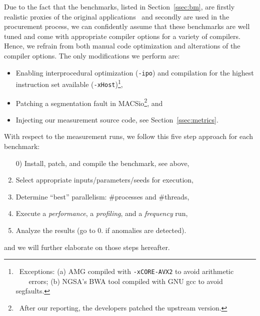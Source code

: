 Due to the fact that the benchmarks, listed in Section~\ref{ssec:bm}, are firstly realistic proxies of the
original applications~\cite{aaziz_methodology_2018} and secondly are used in the procurement process, we can confidently assume
that these benchmarks are well tuned and come with appropriate compiler options for a variety of compilers.
Hence, we refrain from both manual code optimization and alterations of the compiler options.
%
%
The only modifications we perform are:
\begin{itemize}
    \item Enabling interprocedural optimization (\texttt{-ipo}) and compilation for the highest instruction set available (\texttt{-xHost})\footnote{~Exceptions: (a) AMG compiled with \texttt{-xCORE-AVX2} to avoid arithmetic \\$~~~\,\quad$errors; (b) NGSA's BWA tool compiled with GNU gcc to avoid segfaults.},
    \item Patching a segmentation fault in MACSio\footnote{~After our reporting, the developers patched the upstream version.}, and
    \item Injecting our measurement source code, see Section~\ref{ssec:metrics}.
\end{itemize}
%
With respect to the measurement runs, we follow this five step approach for each benchmark:
\begin{enumerate}
    \item[0)] Install, patch, and compile the benchmark, see above, 
    \item Select appropriate inputs/parameters/seeds for execution,
    \item Determine ``best'' parallelism: \#processes and \#threads,
    \item Execute a \textit{performance}, a \textit{profiling}, and a \textit{frequency} run,
    \item Analyze the results (go to 0. if anomalies are detected).
\end{enumerate}
and we will further elaborate on those steps hereafter.

